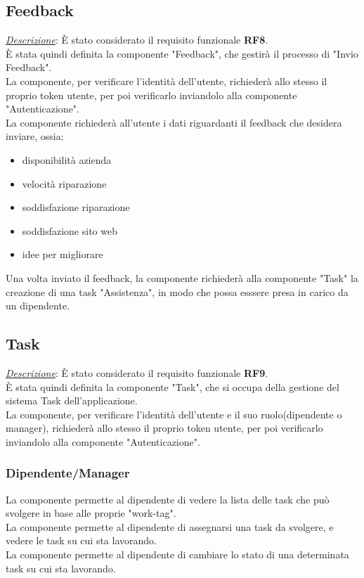 \documentclass{report}
\begin{document}
\subsection*{Feedback}
\uline{\textit{Descrizione}}:
È stato considerato il requisito funzionale \textbf{RF8}.\\
È stata quindi definita la componente "Feedback", che gestirà il processo di "Invio Feedback".\\
La componente, per verificare l'identità dell'utente, richiederà allo stesso il proprio token utente, per poi verificarlo inviandolo alla componente "Autenticazione".\\
La componente richiederà all'utente i dati riguardanti il feedback che desidera inviare, ossia:
\begin{itemize}
	\item disponibilità azienda
	\item velocità riparazione
	\item soddisfazione riparazione
	\item soddisfazione sito web
	\item idee per migliorare
\end{itemize}
Una volta inviato il feedback, la componente richiederà alla componente "Task" la creazione di una task "Assistenza",
in modo che possa esssere presa in carico da un dipendente.

\subsection*{Task}
\uline{\textit{Descrizione}}:
È stato considerato il requisito funzionale \textbf{RF9}.\\
È stata quindi definita la componente "Task", che si occupa della gestione del sistema Task dell'applicazione.\\
La componente, per verificare l'identità dell'utente e il suo ruolo(dipendente o manager), richiederà allo stesso il proprio token utente, per poi verificarlo inviandolo alla componente "Autenticazione".\\

\subsubsection*{Dipendente/Manager}
La componente permette al dipendente di vedere la lista delle task che può svolgere in base alle proprie "work-tag".\\
La componente permette al dipendente di assegnarsi una task da svolgere, e vedere le task su cui sta lavorando.\\
La componente permette al dipendente di cambiare lo stato di una determinata task su cui sta lavorando.
\end{document}
